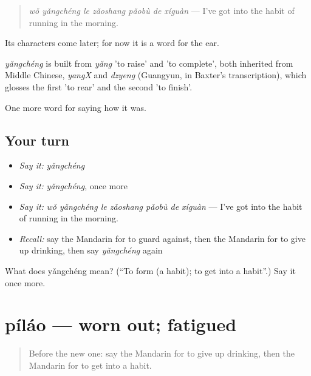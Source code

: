 \begin{quote}
\emph{wǒ yǎngchéng le zǎoshang pǎobù de xíguàn} — I've got into the habit of running in the morning.
\end{quote}

Its characters come later; for now it is a word for the ear.

\begin{cousinweb}
\emph{yǎngchéng} is built from \emph{yǎng} 'to raise' and  'to complete', both inherited from Middle Chinese, \emph{yangX} and \emph{dzyeng} (Guangyun, in Baxter's transcription), which glosses the first 'to rear' and the second 'to finish'.
\end{cousinweb}

\begin{grammarlens}[title={What you've built}]
One more word for saying how it was.
\end{grammarlens}

\subsection*{Your turn}
\begin{itemize}
\raggedright
  \item \emph{Say it:} \emph{yǎngchéng}
  \item \emph{Say it:} \emph{yǎngchéng}, once more
  \item \emph{Say it:} \emph{wǒ yǎngchéng le zǎoshang pǎobù de xíguàn} — I've got into the habit of running in the morning.
  \item \emph{Recall:} say the Mandarin for to guard against, then the Mandarin for to give up drinking, then say \emph{yǎngchéng} again
\end{itemize}

\begin{tcolorbox}[breakable,colback=teal!4,colframe=teal!35!black,title={Before you move on}]
What does yǎngchéng mean? (\textquotedblleft{}To form (a habit); to get into a habit\textquotedblright{}.) Say it once more.
\end{tcolorbox}
\section[píláo]{píláo — worn out; fatigued}

\label{lesson:ZH-C484-pilao}



\begin{quote}
Before the new one: say the Mandarin for to give up drinking, then the Mandarin for to get into a habit.
\end{quote}

